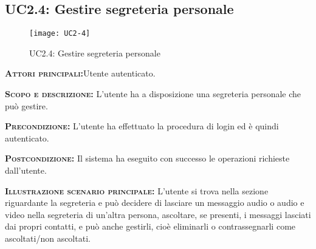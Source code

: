 \subsection{UC2.4: Gestire segreteria personale}
\begin{figure}[h!]
\centering
\texttt{[image: UC2-4]}
\caption{UC2.4: Gestire segreteria personale}\label{UC2.4}
\end{figure}
\begin{description}
\item{\scshape\bfseries Attori principali:}Utente autenticato.
\item{\scshape\bfseries Scopo e descrizione:} L'utente ha a disposizione una segreteria personale che può gestire.
\item{\scshape\bfseries Precondizione:} L'utente ha effettuato la procedura di login ed è quindi autenticato.
\item{\scshape\bfseries Postcondizione:} Il sistema ha eseguito con successo le operazioni richieste dall'utente.
\item{\scshape\bfseries Illustrazione scenario principale:} L'utente si trova nella sezione riguardante la segreteria e può decidere di lasciare un messaggio audio o audio e video nella segreteria di un'altra persona, ascoltare, se presenti, i messaggi lasciati dai propri contatti, e può anche gestirli, cioè eliminarli o contrassegnarli come ascoltati/non ascoltati.
\end{description}

